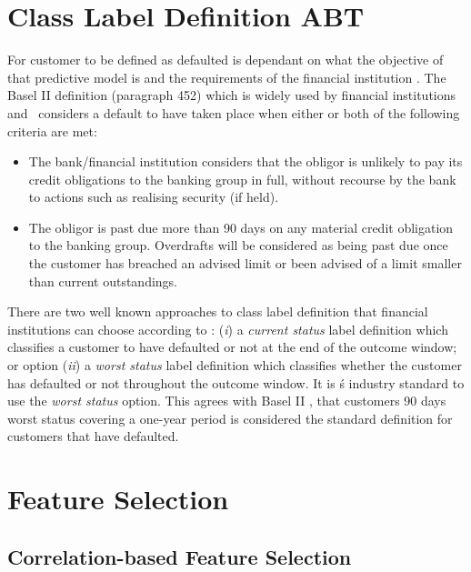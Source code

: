\section{Class Label Definition ABT} \label{classLabelDef}
For customer to be defined as defaulted is dependant on what the objective of that predictive model is and the requirements of the financial institution \citep{mcnab_principles_2000}. The Basel II definition (paragraph 452) which is widely used by financial institutions and \subjectname\ considers a default to have taken place when either or both of the following criteria are met:
\vspace{-3mm} 
\begin{itemize}
	\item The bank/financial institution considers that the obligor is unlikely to pay its credit obligations to the banking group in full, without recourse by the bank to actions such as realising security (if held).
	\item The obligor is past due more than 90 days on any material credit obligation to the banking group. Overdrafts will be considered as being past due once the customer has breached an advised limit or been advised of a limit smaller than current outstandings.
\end{itemize} 

There are two well known approaches to class label definition that financial institutions can choose according to \cite{anderson_credit_2007}: (\textit{i}) a \textit{current status} label definition which classifies a customer to have defaulted or not at the end of the outcome window; or option (\textit{ii}) a \textit{worst status} label definition which classifies whether the customer has defaulted or not throughout the outcome window. It is \subjectname\'s industry standard to use the \textit{worst status} option. This agrees with Basel II \citep{basel_international_2006}, that customers 90 days worst status covering a one-year period is considered the standard definition for customers that have defaulted. 


\section{Feature Selection}
\subsection{Correlation-based Feature Selection}
